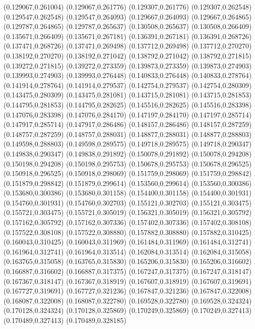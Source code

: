(0.129067,0.261004)
(0.129067,0.261776)
(0.129307,0.261776)
(0.129307,0.262548)
(0.129547,0.262548)
(0.129547,0.264093)
(0.129667,0.264093)
(0.129667,0.264865)
(0.129787,0.264865)
(0.129787,0.265637)
(0.130508,0.265637)
(0.130508,0.266409)
(0.135671,0.266409)
(0.135671,0.267181)
(0.136391,0.267181)
(0.136391,0.268726)
(0.137471,0.268726)
(0.137471,0.269498)
(0.137712,0.269498)
(0.137712,0.270270)
(0.138192,0.270270)
(0.138192,0.271042)
(0.138792,0.271042)
(0.138792,0.271815)
(0.139272,0.271815)
(0.139272,0.273359)
(0.139873,0.273359)
(0.139873,0.274903)
(0.139993,0.274903)
(0.139993,0.276448)
(0.140833,0.276448)
(0.140833,0.278764)
(0.141914,0.278764)
(0.141914,0.279537)
(0.142754,0.279537)
(0.142754,0.280309)
(0.143475,0.280309)
(0.143475,0.281081)
(0.143715,0.281081)
(0.143715,0.281853)
(0.144795,0.281853)
(0.144795,0.282625)
(0.145516,0.282625)
(0.145516,0.283398)
(0.147076,0.283398)
(0.147076,0.284170)
(0.147197,0.284170)
(0.147197,0.285714)
(0.147917,0.285714)
(0.147917,0.286486)
(0.148157,0.286486)
(0.148157,0.287259)
(0.148757,0.287259)
(0.148757,0.288031)
(0.148877,0.288031)
(0.148877,0.288803)
(0.149598,0.288803)
(0.149598,0.289575)
(0.149718,0.289575)
(0.149718,0.290347)
(0.149838,0.290347)
(0.149838,0.291892)
(0.150078,0.291892)
(0.150078,0.294208)
(0.150198,0.294208)
(0.150198,0.295753)
(0.150678,0.295753)
(0.150678,0.296525)
(0.150918,0.296525)
(0.150918,0.298069)
(0.151759,0.298069)
(0.151759,0.298842)
(0.151879,0.298842)
(0.151879,0.299614)
(0.153560,0.299614)
(0.153560,0.300386)
(0.153680,0.300386)
(0.153680,0.301158)
(0.154400,0.301158)
(0.154400,0.301931)
(0.154760,0.301931)
(0.154760,0.302703)
(0.155121,0.302703)
(0.155121,0.303475)
(0.155721,0.303475)
(0.155721,0.305019)
(0.156321,0.305019)
(0.156321,0.305792)
(0.157162,0.305792)
(0.157162,0.307336)
(0.157402,0.307336)
(0.157402,0.308108)
(0.157522,0.308108)
(0.157522,0.308880)
(0.157882,0.308880)
(0.157882,0.310425)
(0.160043,0.310425)
(0.160043,0.311969)
(0.161484,0.311969)
(0.161484,0.312741)
(0.161964,0.312741)
(0.161964,0.313514)
(0.162084,0.313514)
(0.162084,0.315058)
(0.163765,0.315058)
(0.163765,0.315830)
(0.165206,0.315830)
(0.165206,0.316602)
(0.166887,0.316602)
(0.166887,0.317375)
(0.167247,0.317375)
(0.167247,0.318147)
(0.167367,0.318147)
(0.167367,0.318919)
(0.167607,0.318919)
(0.167607,0.319691)
(0.167727,0.319691)
(0.167727,0.321236)
(0.167847,0.321236)
(0.167847,0.322008)
(0.168087,0.322008)
(0.168087,0.322780)
(0.169528,0.322780)
(0.169528,0.324324)
(0.170128,0.324324)
(0.170128,0.325869)
(0.170249,0.325869)
(0.170249,0.327413)
(0.170489,0.327413)
(0.170489,0.328185)
